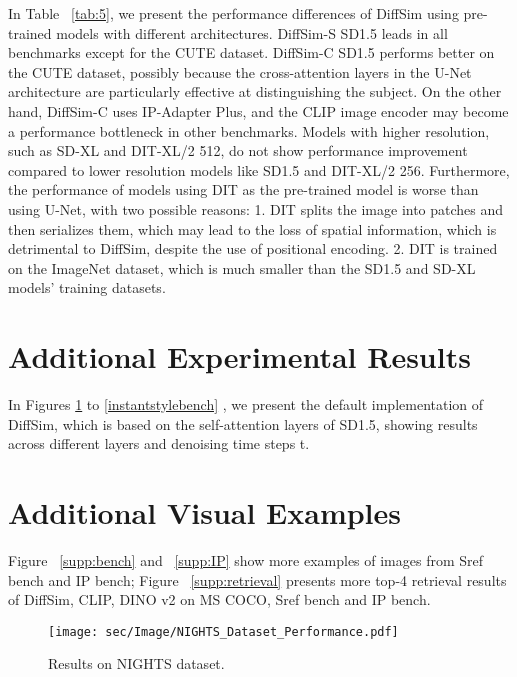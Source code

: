 In Table ~\ref{tab:5}, we present the performance differences of DiffSim using pre-trained models with different architectures. DiffSim-S SD1.5 leads in all benchmarks except for the CUTE dataset. DiffSim-C SD1.5 performs better on the CUTE dataset, possibly because the cross-attention layers in the U-Net architecture are particularly effective at distinguishing the subject. On the other hand, DiffSim-C uses IP-Adapter Plus, and the CLIP image encoder may become a performance bottleneck in other benchmarks. Models with higher resolution, such as SD-XL and DIT-XL/2 512, do not show performance improvement compared to lower resolution models like SD1.5 and DIT-XL/2 256. Furthermore, the performance of models using DIT as the pre-trained model is worse than using U-Net, with two possible reasons: 1. DIT splits the image into patches and then serializes them, which may lead to the loss of spatial information, which is detrimental to DiffSim, despite the use of positional encoding. 2. DIT is trained on the ImageNet dataset, which is much smaller than the SD1.5 and SD-XL models' training datasets.

\section{Additional Experimental Results}
In Figures \ref{nightsbench} to \ref{instantstylebench} , we present the default implementation of DiffSim, which is based on the self-attention layers of SD1.5, showing results across different layers and denoising time steps t.




\section{Additional Visual Examples}
Figure ~\ref{supp:bench} and ~\ref{supp:IP} show more examples of images from Sref bench and IP bench; Figure ~\ref{supp:retrieval} presents more top-4 retrieval results of DiffSim, CLIP, DINO v2 on MS COCO, Sref bench and IP bench.

\begin{figure}[htp]
    \centering
    \texttt{[image: sec/Image/NIGHTS\_Dataset\_Performance.pdf]}
    \caption{Results on NIGHTS dataset.}
    \label{nightsbench}
\end{figure}

